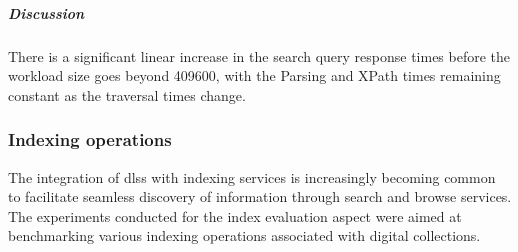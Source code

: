 % 
\begin{comment}
\begin{figure}
 \centering
 \framebox[\textwidth]{%

 }
 \caption[Impact of structure on traversal query phase]{Impact of structure on traversal query phase.}
 \label{fig:experimentation:performance:search:processing-phases-traversal-levels}
\end{figure}

\begin{figure}
 \centering
 \framebox[\textwidth]{%

 }
 \caption[Impact of structure on parsing\index{Parsing} query phase]{Impact of structure on parsing\index{Parsing} query phase.}
 \label{fig:experimentation:performance:search:processing-phases-parsing-levels}
\end{figure}

\begin{figure}
 \centering
 \framebox[\textwidth]{%

 }
 \caption[Impact of structure on XPath\index{XPath} query phase]{Impact of structure on XPath\index{XPath} query phase.}
 \label{fig:experimentation:performance:search:processing-phases-xpath-levels}
\end{figure}
\end{comment}

\subparagraph{Discussion}

There is a significant linear increase in the search query response times before the workload size goes beyond \num{409600}, with the Parsing and XPath times remaining constant as the traversal times change.


\subsubsection{Indexing operations}
\label{sec:evaluation:performance:indexing}

The integration of \glspl{dls} with indexing services is
increasingly becoming common to facilitate seamless discovery of information
through search and browse services. The experiments conducted for the index
evaluation aspect were aimed at benchmarking various indexing operations
associated with digital collections.

